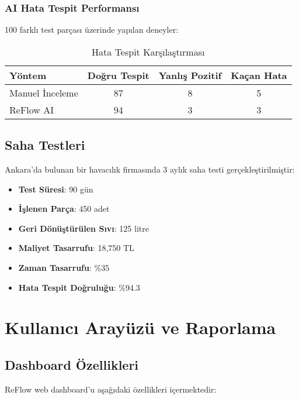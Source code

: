 \documentclass[12pt,a4paper]{article}
\begin{document}
\subsubsection{AI Hata Tespit Performansı}

100 farklı test parçası üzerinde yapılan deneyler:

\begin{table}[H]
    \centering
    \caption{Hata Tespit Karşılaştırması}
    \begin{tabular}{lccc}
        \toprule
        \textbf{Yöntem} & \textbf{Doğru Tespit} & \textbf{Yanlış Pozitif} & \textbf{Kaçan Hata} \\
        \midrule
        Manuel İnceleme & 87 & 8 & 5 \\
        ReFlow AI & 94 & 3 & 3 \\
        \bottomrule
    \end{tabular}
    \label{tab:detection_comparison}
\end{table}

\subsection{Saha Testleri}

Ankara'da bulunan bir havacılık firmasında 3 aylık saha testi gerçekleştirilmiştir:

\begin{itemize}
    \item \textbf{Test Süresi}: 90 gün
    \item \textbf{İşlenen Parça}: 450 adet
    \item \textbf{Geri Dönüştürülen Sıvı}: 125 litre
    \item \textbf{Maliyet Tasarrufu}: 18,750 TL
    \item \textbf{Zaman Tasarrufu}: \%35
    \item \textbf{Hata Tespit Doğruluğu}: \%94.3
\end{itemize}

\section{Kullanıcı Arayüzü ve Raporlama}

\subsection{Dashboard Özellikleri}

ReFlow web dashboard'u aşağıdaki özellikleri içermektedir:
\end{document}
